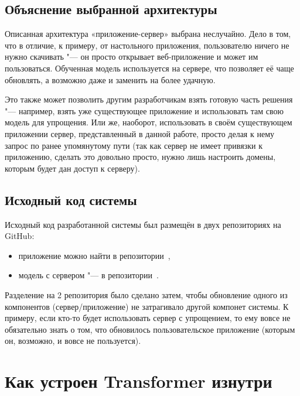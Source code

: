 \subsection{Объяснение выбранной архитектуры}


Описанная архитектура «приложение-сервер» выбрана неслучайно. Дело в том, что в отличие, к примеру, от настольного приложения, пользователю ничего не нужно скачивать "--- он просто открывает веб-приложение и может им пользоваться. Обученная модель используется на сервере, что позволяет её чаще обновлять, а возможно даже и заменить на более удачную.

Это также может позволить другим разработчикам взять готовую часть решения "--- например, взять уже существующее приложение и использовать там свою модель для упрощения. Или же, наоборот, использовать в своём существующем приложении сервер, представленный в данной работе, просто делая к нему запрос по ранее упомянутому пути (так как сервер не имеет привязки к приложению, сделать это довольно просто, нужно лишь настроить домены, которым будет дан доступ к серверу).


\subsection{Исходный код системы}


Исходный код разработанной системы был размещён в двух репозиториях на GitHub:
\begin{itemize}%
  \item приложение можно найти в репозитории~\cite{AppGithub},
  \item модель с сервером "--- в репозитории~\cite{ServerGithub}.
\end{itemize}

Разделение на 2 репозитория было сделано затем, чтобы обновление одного из компонентов (сервер/приложение) не затрагивало другой компонет системы.
К примеру, если кто-то будет использовать сервер с упрощением, то ему вовсе не обязательно знать о том, что обновилось пользовательское приложение (которым он, возможно, и вовсе не пользуется).


\section{Как устроен Transformer изнутри}


